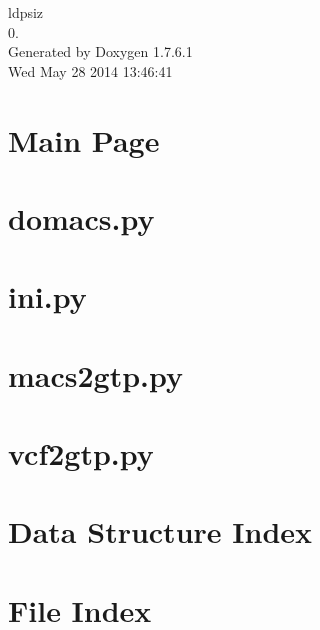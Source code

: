 \documentclass[letterpaper]{article}
\begin{document}
\hypersetup{pageanchor=false,citecolor=blue}
\begin{titlepage}
\vspace*{7cm}
\begin{center}
{\Large ldpsiz \\[1ex]\large 0. }\\
\vspace*{1cm}
{\large \-Generated by Doxygen 1.7.6.1}\\
\vspace*{0.5cm}
{\small Wed May 28 2014 13:46:41}\\
\end{center}
\end{titlepage}
\tableofcontents
{}
\hypersetup{pageanchor=true,citecolor=blue}
\section{\-Main \-Page}
\label{index}\hypertarget{index}{}
\section{domacs.\-py}
\label{domacs.py}
\hypertarget{domacs.py}{}

\section{ini.\-py}
\label{ini.py}
\hypertarget{ini.py}{}

\section{macs2gtp.\-py}
\label{macs2gtp.py}
\hypertarget{macs2gtp.py}{}

\section{vcf2gtp.\-py}
\label{vcf2gtp.py}
\hypertarget{vcf2gtp.py}{}

\section{\-Data \-Structure \-Index}

\section{\-File \-Index}

\end{document}
